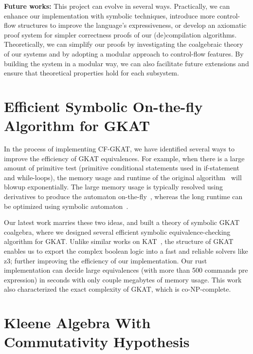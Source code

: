 \documentclass[11pt,a4paper,sans]{moderncv} %
\begin{document}
\textbf{Future works:}
This project can evolve in several ways. 
Practically, we can enhance our implementation with symbolic techniques, introduce more control-flow structures to improve the language's expressiveness, or develop an axiomatic proof system for simpler correctness proofs of our (de)compilation algorithms.
Theoretically, we can simplify our proofs by investigating the coalgebraic theory of our systems and by adopting a modular approach to control-flow features. 
By building the system in a modular way, we can also facilitate future extensions and ensure that theoretical properties hold for each subsystem. 

\section{Efficient Symbolic On-the-fly Algorithm for GKAT}

In the process of implementing CF-GKAT, we have identified several ways to improve the efficiency of GKAT equivalences.
For example, when there is a large amount of primitive test (primitive conditional statements used in if-statement and while-loops), the memory usage and runtime of the original algorithm~\cite{smolka_GuardedKleeneAlgebra_2020} will blowup exponentially. 
The large memory usage is typically resolved using derivatives to produce the automaton on-the-fly~\cite{brzozowski_DerivativesRegularExpressions_1964, schmid_GuardedKleeneAlgebra_2021}, whereas the long runtime can be optimized using symbolic automaton~\cite{pous_SymbolicAlgorithmsLanguage_2015}. 

Our latest work marries these two ideas, and built a theory of symbolic GKAT coalgebra, where we designed several efficient symbolic equivalence-checking algorithm for GKAT. 
Unlike similar works on KAT~\cite{pous_SymbolicAlgorithmsLanguage_2015}, the structure of GKAT enables us to export the complex boolean logic into a fast and reliable solvers like z3; further improving the efficiency of our implementation.
Our rust implementation can decide large equivalences (with more than 500 commands pre expression) in seconds with only couple megabytes of memory usage.
This work also characterized the exact complexity of GKAT, which is co-NP-complete.


\section{Kleene Algebra With Commutativity Hypothesis}
\end{document}
